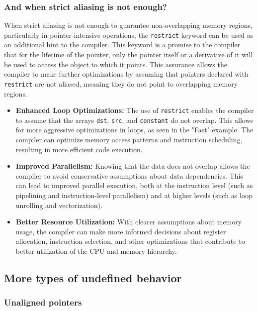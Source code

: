 \documentclass[12pt]{article}
\begin{document}
\subsubsection{And when strict aliasing is not enough?}

When strict aliasing is not enough to guarantee non-overlapping memory regions, particularly in pointer-intensive operations, the \texttt{restrict} keyword can be used as an additional hint to the compiler. This keyword is a promise to the compiler that for the lifetime of the pointer, only the pointer itself or a derivative of it will be used to access the object to which it points. This assurance allows the compiler to make further optimizations by assuming that pointers declared with \texttt{restrict} are not aliased, meaning they do not point to overlapping memory regions.

\begin{itemize}
    \item \textbf{Enhanced Loop Optimizations:} The use of \texttt{restrict} enables the compiler to assume that the arrays \texttt{dst}, \texttt{src}, and \texttt{constant} do not overlap. This allows for more aggressive optimizations in loops, as seen in the "Fast" example. The compiler can optimize memory access patterns and instruction scheduling, resulting in more efficient code execution.
    
    \item \textbf{Improved Parallelism:} Knowing that the data does not overlap allows the compiler to avoid conservative assumptions about data dependencies. This can lead to improved parallel execution, both at the instruction level (such as pipelining and instruction-level parallelism) and at higher levels (such as loop unrolling and vectorization).
    
    \item \textbf{Better Resource Utilization:} With clearer assumptions about memory usage, the compiler can make more informed decisions about register allocation, instruction selection, and other optimizations that contribute to better utilization of the CPU and memory hierarchy.
\end{itemize}

\subsection{More types of undefined behavior}

\subsubsection{Unaligned pointers}
\end{document}

